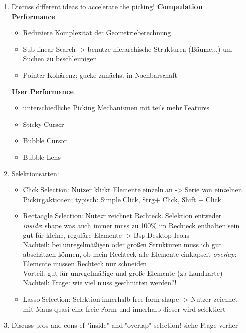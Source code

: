 \begin{enumerate}
	\item Discuss different ideas to accelerate the picking!
	\textbf{Computation Performance}
	\begin{itemize}
		\item Reduziere Komplexität der Geometrieberechnung
		\item Sub-linear Search -> benutze hierarchische Strukturen (Bäume,..) um Suchen zu beschleunigen
		\item Pointer Kohärenz: gucke zunächst in Nachbarschaft
	\end{itemize}
	\textbf{User Performance}
	\begin{itemize}
		\item unterschiedliche Picking Mechanismen mit teils mehr Features
		\item Sticky Cursor
		\item Bubble Cursor
		\item Bubble Lens
	\end{itemize}
	
	\item Selektionsarten:
	\begin{itemize}
		\item Click Selection: Nutzer klickt Elemente einzeln an -> Serie von einzelnen Pickingaktionen; typisch: Simple Click, Strg+ Click, Shift + Click
		
		\item Rectangle Selection: Nutezr zeichnet Rechteck. Selektion entweder\\
		\textit{inside}: shape was auch immer muss zu 100\% im Rechteck enthalten sein\\
		gut für kleine, reguläre Elemente -> Bsp Desktop Icons\\
		Nachteil: bei unregelmäßigen oder großen Strukturen muss ich gut abschätzen können, ob mein Rechteck alle Elemente einkapselt
		\textit{overlap}: Elemente müssen Rechteck nur schneiden\\
		Vorteil: gut für unregelmäßige und große Elemente (zb Landkarte)\\
		Nachteil: Frage: wie viel muss geschnitten werden?!
		
		
		\item Lasso Selection: Selektion innerhalb free-form shape -> Nutzer zeichnet mit Maus quasi eine freie Form und innerhalb dieser wird selektiert
	\end{itemize}
	
	\item Discuss pros and cons of "inside" and "overlap" selection!
	siehe Frage vorher
	

\end{enumerate}
